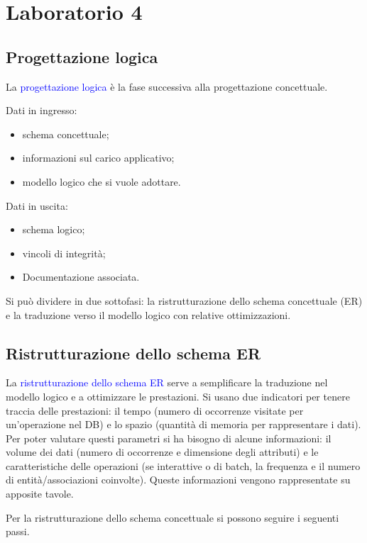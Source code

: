 \chapter{Laboratorio 4}

\section{Progettazione logica}

La \textcolor{blue}{progettazione logica} è la fase successiva alla progettazione concettuale. 

Dati in ingresso: 
\begin{itemize}
    \item schema concettuale;
    \item informazioni sul carico applicativo;
    \item modello logico che si vuole adottare.
\end{itemize}

Dati in uscita: 
\begin{itemize}
    \item schema logico;
    \item vincoli di integrità;
    \item Documentazione associata.
\end{itemize}

Si può dividere in due sottofasi: la ristrutturazione dello schema concettuale (ER) e la traduzione verso il modello logico con relative ottimizzazioni.

\section{Ristrutturazione dello schema ER}

La \textcolor{blue}{ristrutturazione dello schema ER} serve a semplificare la traduzione nel modello logico e a ottimizzare le prestazioni. Si usano due indicatori per tenere traccia delle prestazioni: il tempo (numero di occorrenze visitate per un'operazione nel DB) e lo spazio (quantità di memoria per rappresentare i dati). Per poter valutare questi parametri si ha bisogno di alcune informazioni: il volume dei dati (numero di occorrenze e dimensione degli attributi) e le caratteristiche delle operazioni (se interattive o di batch, la frequenza e il numero di entità/associazioni coinvolte). Queste informazioni  vengono rappresentate su apposite tavole.

Per la ristrutturazione dello schema concettuale si possono seguire i seguenti passi.

